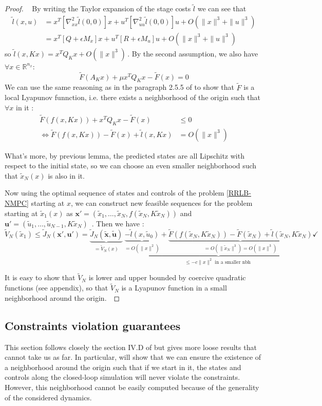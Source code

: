 \documentclass[12pt]{article}
\theoremstyle{definition}
\theoremstyle{remark}
\newcommand{\R}{\mathbb{R}}
\begin{document}
\begin{proof}~
	By writing the Taylor expansion of the stage costs $\tilde{l}$ we can see that
	\begin{align*}
		\tilde{l}(x,u)&=x^T[\nabla_{xx}^2\tilde{l}(0,0)] x+u^T[\nabla_{uu}^2\tilde{l}(0,0)]u+O(\|x\|^3+\|u\|^3)\\
		&=x^T[Q+\epsilon M_x]x+u^T[R+\epsilon M_u]u+O(\|x\|^3+\|u\|^3)
	\end{align*}
	so $\tilde{l}(x,Kx)=x^TQ_Kx+O(\|x\|^3)$\,.
	By the second assumption, we also have $\forall x\in\R^{n_x}$:
	$$\tilde{F}(A_Kx)+\mu x^T Q_K x-\tilde{F}(x)=0$$
	We can use the same reasoning as in the paragraph 2.5.5 of \cite[MPC Theory, Computation and Design]{MPC-book} to show that $\tilde{F}$ is a local Lyapunov funnction, i.e. there exists a neighborhood of the origin such that $\forall x$ in it :
	\begin{align*}
		\tilde{F}(f(x,Kx))+x^T Q_K x-\tilde{F}(x)&\leq 0\\
		\Longleftrightarrow\tilde{F}(f(x,Kx))-\tilde{F}(x)+\tilde{l}(x,Kx)&= O(\|x\|^3)
	\end{align*}

	What's more, by previous lemma, the predicted states are all Lipschitz with respect to the initial state, so we can choose an even smaller neighborhood such that $\tilde{x}_N(x)$ is also in it.
	
	Now using the optimal sequence of states and controls of the problem \ref{RRLB-NMPC} starting at $x$, we can construct new feasible sequences for the problem starting at $\tilde{x}_1(x)$ as 
	$\mathbf{x}'=(\tilde{x}_1,\dots,\tilde{x}_N,f(\tilde{x}_N,K\tilde{x}_N))$ and $\mathbf{u}'=(\tilde{u}_1,\dots,\tilde{u}_{N-1},K\tilde{x}_N)$ \,.
	Then we have :
	$$\tilde{V}_N(\tilde{x}_1)\leq\tilde{J}_N(\mathbf{x}',\mathbf{u}')=\underbrace{\tilde{J}_N(\tilde{\mathbf{x}},\tilde{\mathbf{u}})}_{=\tilde{V}_N(x)}~\underbrace{\underbrace{-\tilde{l}(x,\tilde{u}_0)}_{=O(\|x\|^2)}+\underbrace{\tilde{F}(f(\tilde{x}_N,K\tilde{x}_N))-\tilde{F}(\tilde{x}_N)+\tilde{l}(\tilde{x}_N,K\tilde{x}_N) }_{=O(\|\tilde{x}_N\|^3)=O(\|x\|^3)} }_{\leq-c\|x\|^2\text{ in a smaller nbh }}\checkmark$$
	
	It is easy to show that $\tilde{V}_N$ is lower and upper bounded by coercive quadratic functions (see appendix), so that $\tilde{V}_N$ is a Lyapunov function in a small neighborhood around the origin.~\checkmark
\end{proof}

\subsection{Constraints violation guarantees}
This section follows closely the section IV.D of \cite{RRLB-linear-MPC} but gives more loose results that cannot take us as far.
In particular, will show that we can ensure the existence of a neighborhood around the origin such that if we start in it, the states and controls along the closed-loop simulation will never violate the constraints.
However, this neighborhood cannot be easily computed because of the generality of the considered dynamics.
\end{document}
